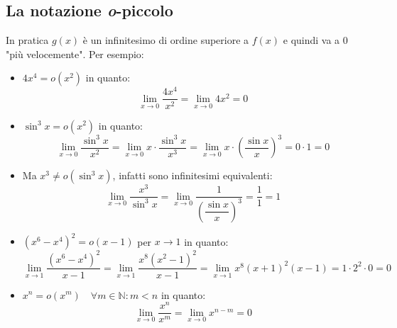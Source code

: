 \subsection{La notazione \textit{o}-piccolo}
In pratica $g(x)$ è un infinitesimo di ordine superiore a $f(x)$ e quindi va a 0 "più velocemente". Per esempio:
\begin{itemize}
	\item $4x^4 = o(x^2)$ in quanto:
		\begin{equation*}
			\lim_{x \to 0} \dfrac{4x^4}{x^2} = \lim_{x \to 0} 4x^2 = 0
		\end{equation*}
	\item $\sin^3{x} = o(x^2)$ in quanto:
		\begin{equation*}
			\lim_{x \to 0} \dfrac{\sin^3{x}}{x^2} = \lim_{x \to 0} x \cdot \dfrac{\sin^3{x}}{x^3} = \lim_{x \to 0} x \cdot \left(\dfrac{\sin{x}}{x} \right)^3 = 0 \cdot 1 = 0
		\end{equation*}
	
	\item Ma $x^3 \neq o(\sin^3{x})$, infatti sono infinitesimi equivalenti:
		\begin{equation*}
			\lim_{x \to 0} \dfrac{x^3}{\sin^3{x}} = \lim_{x \to 0} \dfrac{1}{\left(\dfrac{\sin{x}}{x} \right)^3} = \dfrac{1}{1} = 1
		\end{equation*}

	\item $(x^6 - x^4)^2 = o(x-1)$ per $x \to 1$ in quanto:
		\begin{equation*}
			\lim_{x \to 1} \dfrac{(x^6 - x^4)^2}{x-1} = \lim_{x \to 1} \dfrac{x^8 (x^2 -1)^2}{x-1} = \lim_{x \to 1} x^8 (x+1)^2 (x-1) = 1 \cdot 2^2 \cdot 0 = 0
		\end{equation*}

	\item $x^n = o(x^m) \quad \forall m \in \mathbb{N}: m < n$ in quanto:
		\begin{equation*}
			\lim_{x \to 0} \dfrac{x^n}{x^m} = \lim_{x \to 0} x^{n-m} = 0
		\end{equation*}
\end{itemize}
